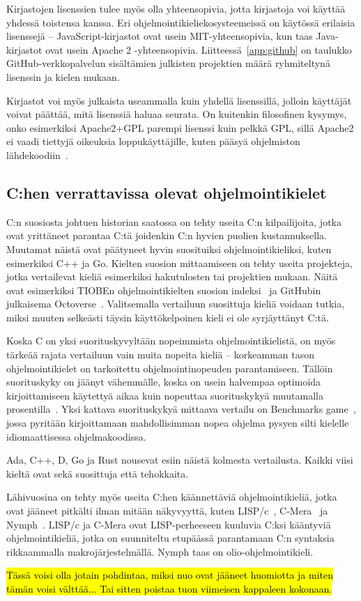 Kirjastojen lisenssien tulee myös olla yhteensopivia, jotta kirjastoja voi
käyttää yhdessä toistensa kanssa. Eri ohjelmointikieliekosysteemeissä on
käytössä erilaisia lisenssejä -- JavaScript-kirjastot ovat usein
MIT-yhteensopivia, kun taas Java-kirjastot ovat usein Apache 2 -yhteensopivia.
Liitteessä~\ref{app:github} on taulukko GitHub-verkkopalvelun sisältämien
julkisten projektien määrä ryhmiteltynä lisenssin ja kielen mukaan.

Kirjastot voi myös julkaista useammalla kuin yhdellä lisenssillä, jolloin
käyttäjät voivat päättää, mitä lisenssiä haluaa seurata. On kuitenkin
filosofinen kysymys, onko esimerkiksi Apache2+GPL parempi lisenssi kuin pelkkä
GPL, sillä Apache2 ei vaadi tiettyjä oikeuksia loppukäyttäjille, kuten pääsyä
ohjelmiston lähdekoodiin~\citep{apachetldr, gpl3tldr}.

\subsection{C:hen verrattavissa olevat ohjelmointikielet}

C:n suosiosta johtuen historian saatossa on tehty useita C:n kilpailijoita,
jotka ovat yrittäneet parantaa C:tä joidenkin C:n hyvien puolien
kustannuksella. Muutamat näistä ovat päätyneet hyvin suosituiksi
ohjelmointikieliksi, kuten esimerkiksi C++ ja Go. Kielten suosion mittaamiseen
on tehty useita projekteja, jotka vertailevat kieliä esimerkiksi hakutulosten
tai projektien mukaan. Näitä ovat esimerkiksi TIOBEn ohjelmointikielten suosion
indeksi~\citep{tiobe} ja GitHubin julkaisema Octoverse~\citep{octoverse}.
Valitsemalla vertailuun suosittuja kieliä voidaan tutkia, miksi muuten selkeästi
täysin käyttökelpoinen kieli ei ole syrjäyttänyt C:tä.

Koska C on yksi suorituskyvyltään nopeimmista ohjelmointikielistä, on myös
tärkeää rajata vertailuun vain muita nopeita kieliä -- korkeamman tason
ohjelmointikielet on tarkoitettu ohjelmointinopeuden parantamiseen. Tällöin
suorituskyky on jäänyt vähemmälle, koska on usein halvempaa optimoida
kirjoittamiseen käytettyä aikaa kuin nopeuttaa suorituskykyä muutamalla
prosentilla~\citationneeded. Yksi kattava suorituskykyä mittaava vertailu on
Benchmarks game~\citep{benchmarks}, jossa pyritään kirjoittamaan mahdollisimman
nopea ohjelma pysyen silti kielelle idiomaattisessa ohjelmakoodissa.

Ada, C++, D, Go ja Rust nousevat esiin näistä kolmesta vertailusta. Kaikki
viisi kieltä ovat sekä suosittuja että tehokkaita.

Lähivuosina on tehty myös useita C:hen käännettäviä ohjelmointikieliä, jotka
ovat jääneet pitkälti ilman mitään näkyvyyttä, kuten LISP/c~\citep{clisp1},
C-Mera~\citep{clisp2} ja Nymph~\citep{nymph}. LISP/c ja C-Mera ovat
LISP-perheeseen kuuluvia C:ksi kääntyviä ohjelmointikieliä, jotka on
suunniteltu etupäässä parantamaan C:n syntaksia rikkaammalla
makrojärjestelmällä. Nymph taas on olio-ohjelmointikieli.

\hl{Tässä voisi olla jotain pohdintaa, miksi nuo ovat jääneet huomiotta ja
miten tämän voisi välttää... Tai sitten poistaa tuon viimeisen kappaleen
kokonaan.}

